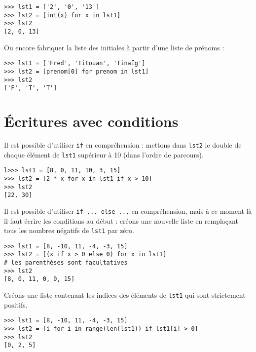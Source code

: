 \begin{pyc}
\begin{verbatim}
>>> lst1 = ['2', '0', '13']
>>> lst2 = [int(x) for x in lst1]
>>> lst2
[2, 0, 13]
\end{verbatim}
\end{pyc}


Ou encore fabriquer la liste des initiales à partir d'une liste de prénoms :
\begin{pyc}
\begin{verbatim}
>>> lst1 = ['Fred', 'Titouan', 'Tinaïg']
>>> lst2 = [prenom[0] for prenom in lst1]
>>> lst2
['F', 'T', 'T']
\end{verbatim}
\end{pyc}

\section{\'Ecritures avec conditions}



Il est possible d'utiliser \texttt{if} en compréhension : mettons dans \texttt{lst2} le double de chaque élément de \texttt{lst1} supérieur à 10 (dans l'ordre de parcours).
\begin{pyc}
\begin{verbatim}
l>>> lst1 = [8, 0, 11, 10, 3, 15]
>>> lst2 = [2 * x for x in lst1 if x > 10]
>>> lst2
[22, 30]
\end{verbatim}
\end{pyc}



Il est possible d'utiliser \texttt{if ... else ...} en compréhension, mais à ce moment là il faut écrire les conditions au début   : créons une nouvelle liste en remplaçant tous les nombres négatifs de \texttt{lst1} par zéro.
\begin{pyc}
\begin{verbatim}
>>> lst1 = [8, -10, 11, -4, -3, 15]
>>> lst2 = [(x if x > 0 else 0) for x in lst1]
# les parenthèses sont facultatives
>>> lst2
[8, 0, 11, 0, 0, 15]
\end{verbatim}
\end{pyc}

Créons une liste contenant les indices des éléments de \texttt{lst1} qui sont strictement positifs.
\begin{pyc}
\begin{verbatim}
>>> lst1 = [8, -10, 11, -4, -3, 15]
>>> lst2 = [i for i in range(len(lst1)) if lst1[i] > 0]
>>> lst2
[0, 2, 5]
\end{verbatim}
\end{pyc}

